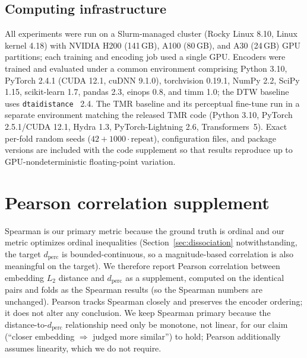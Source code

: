 \documentclass[letterpaper]{article} %
\begin{document}
\subsection{Computing infrastructure}
All experiments were run on a Slurm-managed cluster (Rocky Linux 8.10, Linux kernel 4.18) with
NVIDIA H200 (141\,GB), A100 (80\,GB), and A30 (24\,GB) GPU partitions; each training and encoding
job used a single GPU. Encoders were trained and evaluated under a common environment comprising Python
3.10, PyTorch 2.4.1 (CUDA 12.1, cuDNN 9.1.0), torchvision 0.19.1, NumPy 2.2, SciPy 1.15,
scikit-learn 1.7, pandas 2.3, einops 0.8, and timm 1.0; the DTW baseline uses \texttt{dtaidistance}~\citep{meert2020dtaidistance}
2.4. The TMR baseline and its perceptual fine-tune run in a separate environment matching the
released TMR code (Python 3.10, PyTorch 2.5.1/CUDA 12.1, Hydra 1.3, PyTorch-Lightning 2.6,
Transformers~5). Exact per-fold random seeds ($42 + 1000\cdot\text{repeat}$), configuration files,
and package versions are included with the code supplement so that results reproduce up to
GPU-nondeterministic floating-point variation.

\appendix
\section{Pearson correlation supplement}
\label{app:pearson}
Spearman is our primary metric because the ground truth is ordinal and our metric optimizes ordinal
inequalities (Section~\ref{sec:dissociation} notwithstanding, the target $d_{\text{perc}}$ is
bounded-continuous, so a magnitude-based correlation is also meaningful on the target). We therefore
report Pearson correlation between embedding $L_2$ distance and $d_{\text{perc}}$ as a supplement,
computed on the identical pairs and folds as the Spearman results (so the Spearman numbers are
unchanged). Pearson tracks Spearman closely and preserves the encoder ordering; it does not alter any
conclusion. We keep Spearman primary because the distance-to-$d_{\text{perc}}$ relationship need only
be monotone, not linear, for our claim (``closer embedding $\Rightarrow$ judged more similar'') to
hold; Pearson additionally assumes linearity, which we do not require.
\end{document}
